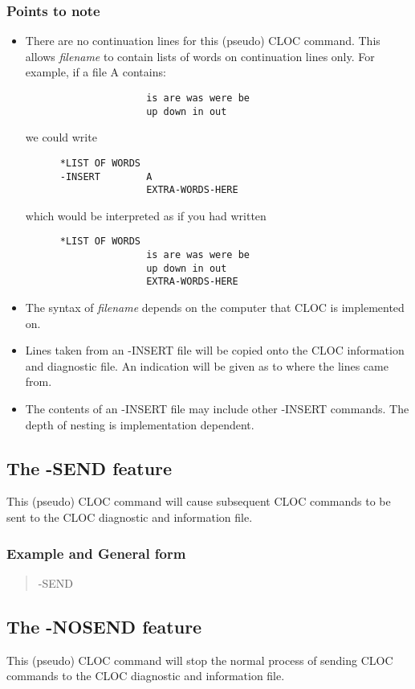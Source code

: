 \subsubsection{Points to note}
\begin{itemize}
\item There are no continuation lines for this (pseudo) CLOC command.
      This allows {\em filename} to contain lists of words on continuation
      lines only. For example, if a file  A  contains:
      \begin{verbatim}
                     is are was were be
                     up down in out
      \end{verbatim}
we could write
      \begin{verbatim}
      *LIST OF WORDS
      -INSERT        A
                     EXTRA-WORDS-HERE
      \end{verbatim}

which would be interpreted as if you had written
      \begin{verbatim}
      *LIST OF WORDS
                     is are was were be
                     up down in out
                     EXTRA-WORDS-HERE
      \end{verbatim}
\item The syntax of {\em filename} depends on the computer that CLOC
      is implemented on.
\item Lines taken from an -INSERT file will be copied onto the
      CLOC information and diagnostic file. An indication will be
      given as to where the lines came from.
\item The contents of an -INSERT file may include other -INSERT commands.
      The depth of nesting is implementation dependent.
\end{itemize}

\subsection{The -SEND feature}
This (pseudo) CLOC command will cause subsequent CLOC commands to be
sent to the CLOC diagnostic and information file.

\subsubsection{Example and General form}
\begin{quote}
-SEND
\end{quote}

\subsection{The -NOSEND feature}
This (pseudo) CLOC command will stop the normal process of sending
CLOC commands to the CLOC diagnostic and information file.

